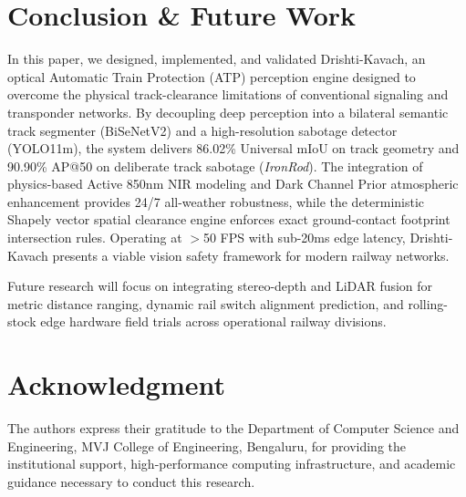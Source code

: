 \documentclass[conference]{IEEEtran}
\begin{document}
\section{Conclusion \& Future Work}

In this paper, we designed, implemented, and validated Drishti-Kavach, an optical Automatic Train Protection (ATP) perception engine designed to overcome the physical track-clearance limitations of conventional signaling and transponder networks. By decoupling deep perception into a bilateral semantic track segmenter (BiSeNetV2) and a high-resolution sabotage detector (YOLO11m), the system delivers 86.02\% Universal mIoU on track geometry and 90.90\% AP@50 on deliberate track sabotage (\textit{IronRod}). The integration of physics-based Active 850nm NIR modeling and Dark Channel Prior atmospheric enhancement provides 24/7 all-weather robustness, while the deterministic Shapely vector spatial clearance engine enforces exact ground-contact footprint intersection rules. Operating at $>$50 FPS with sub-20ms edge latency, Drishti-Kavach presents a viable vision safety framework for modern railway networks.

Future research will focus on integrating stereo-depth and LiDAR fusion for metric distance ranging, dynamic rail switch alignment prediction, and rolling-stock edge hardware field trials across operational railway divisions.

\section*{Acknowledgment}
The authors express their gratitude to the Department of Computer Science and Engineering, MVJ College of Engineering, Bengaluru, for providing the institutional support, high-performance computing infrastructure, and academic guidance necessary to conduct this research.
\end{document}
